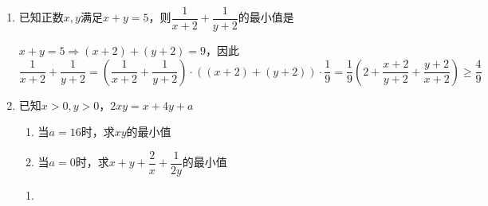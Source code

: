 \begin{enumerate}
\begin{jieda}
\begin{enumerate}
\begin{enumerate}
                $\dfrac{1}{x} + \dfrac{4}{y} = 2$可以变形为$\dfrac{y}{4} = \dfrac{1}{2-\dfrac{1}{x}} = \dfrac{x}{2x-1} = \dfrac{1}{2} + \dfrac{1}{2(2x-1)}$。 \\
                因此$x+\dfrac{y}{4} = x + \dfrac{1}{2} + \dfrac{1}{2(2x-1)} = \dfrac{2x-1}{2} + \dfrac{1}{2(2x-1)} + 1 \geq 1 + 2\sqrt{\dfrac{1}{4}} = 2$\\
                （$x = 1, y = 4$时取等）
            \end{enumerate}
            因此有$m^2 - m \leq 2$，解得$m \in [-1, 2]$
            \end{enumerate}
    \end{jieda}
    \item 已知正数$x, y$满足$x+y = 5$，则$\dfrac{1}{x+2} + \dfrac{1}{y+2}$的最小值是 
    \begin{jieda}
        $x+y=5 \Longrightarrow (x+2)+(y+2) = 9$，因此$\dfrac{1}{x+2}+\dfrac{1}{y+2} = \left(\dfrac{1}{x+2}+\dfrac{1}{y+2}\right) \cdot ((x+2)+(y+2)) \cdot \dfrac{1}{9} = \dfrac{1}{9} \left(2 + \dfrac{x+2}{y+2} + \dfrac{y+2}{x+2}\right) \geq \dfrac{4}{9}$
    \end{jieda}

    \item 已知$x > 0, y > 0$，$2xy = x + 4y + a$
    \begin{enumerate}
        \item 当$a = 16$时，求$xy$的最小值
        \item 当$a = 0$时，求$x+y+\dfrac{2}{x}+\dfrac{1}{2y}$的最小值
    \end{enumerate}
    \begin{jieda}
        \begin{enumerate}
            \item 
\end{enumerate}
\end{jieda}
\end{enumerate}
